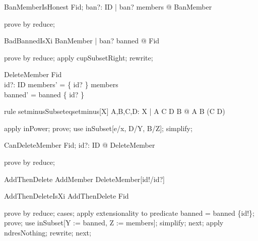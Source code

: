 \documentclass{article}
\begin{document}

\begin{theorem}{BanMemberIsHonest}
  \forall Fid; ban?: ID | ban? \in \dom members @ \pre BanMember
\end{theorem}

\begin{zproof}
prove by reduce;
\end{zproof}

\begin{theorem}{BadBannedIsXi}
  \forall BanMember | ban? \in banned @ \Xi Fid
\end{theorem}

\begin{zproof}
prove by reduce;
apply cupSubsetRight;
rewrite;
\end{zproof}

\begin{schema}{DeleteMember}
  \Delta Fid \\
  id?: ID
\where
  members' = \{ id? \} \ndres members \\
  banned' = banned \setminus \{ id? \}
\end{schema}

\begin{theorem}{rule setminusSubseteqsetminus}[X]
  \forall A,B,C,D: \power X
        | A \subseteq C \land D \subseteq B
        @ A \setminus B \in \power (C \setminus D)
\end{theorem}

\begin{zproof}
apply inPower;
prove;
use inSubset[e/x, D/Y, B/Z];
simplify;
\end{zproof}

\begin{theorem}{CanDeleteMember}
  \forall Fid; id?: ID @ \pre DeleteMember
\end{theorem}

\begin{zproof}
prove by reduce;
\end{zproof}


\begin{zed}
  AddThenDelete  AddMember \semi DeleteMember[id!/id?]
\end{zed}

\begin{theorem}{AddThenDeleteIsXi}
  AddThenDelete \implies \Xi Fid
\end{theorem}
\begin{zproof}
prove by reduce;
cases;
apply extensionality to predicate  banned = banned \setminus \{id!\};
prove;
use inSubset[Y := banned, Z := \dom members];
simplify;
next;
apply ndresNothing;
rewrite;
next;
\end{zproof}
\end{document}
